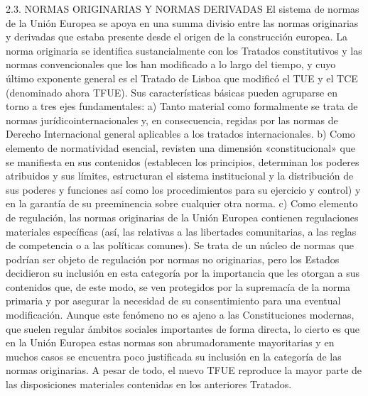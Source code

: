 \documentclass[10pt,a4paper]{article}
\begin{document}
2.3. NORMAS ORIGINARIAS Y NORMAS DERIVADAS
El sistema de normas de la Unión Europea se apoya en una summa divisio entre las normas originarias y derivadas que estaba presente desde el origen de la construcción europea. La norma originaria se identifica sustancialmente con los Tratados constitutivos y las normas convencionales que los han modificado a lo largo del tiempo, y cuyo último exponente general es el Tratado de Lisboa que modificó el TUE y el TCE (denominado ahora TFUE). Sus características básicas pueden agruparse en torno a tres ejes fundamentales: a) Tanto material como formalmente se trata de normas jurídicointernacionales y, en consecuencia, regidas por las normas de Derecho Internacional general aplicables a los tratados internacionales. b) Como elemento de normatividad esencial, revisten una dimensión «constitucional» que se manifiesta en sus contenidos (establecen los principios, determinan los poderes atribuidos y sus límites, estructuran el sistema institucional y la distribución de sus poderes y funciones así como los procedimientos para su ejercicio y control) y en la garantía de su preeminencia sobre cualquier otra norma.
c) Como elemento de regulación, las normas originarias de la Unión Europea contienen regulaciones materiales específicas (así, las relativas a las libertades comunitarias, a las reglas de competencia o a las políticas comunes). Se trata de un núcleo de normas que podrían ser objeto de regulación por normas no originarias, pero los Estados decidieron su inclusión en esta categoría por la importancia que les otorgan a sus contenidos que, de este modo, se ven protegidos por la supremacía de la norma primaria y por asegurar la necesidad de su consentimiento para una eventual modificación. Aunque este fenómeno no es ajeno a las Constituciones modernas, que suelen regular ámbitos sociales importantes de forma directa, lo cierto es que en la Unión Europea estas normas son abrumadoramente mayoritarias y en muchos casos se encuentra poco justificada su inclusión en la categoría de las normas originarias. A pesar de todo, el nuevo TFUE reproduce la mayor parte de las disposiciones materiales contenidas en los anteriores Tratados.
\end{document}
